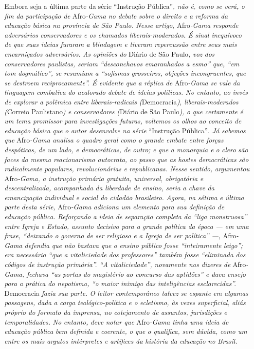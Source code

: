 \begin{didascalia}
Embora seja a última parte da série ``Instrução Pública''\emph{, não é,
como se verá, o fim da participação de} Afro\emph{-Gama no debate sobre
o direito e a reforma da educação básica na província de São Paulo.
Nesse artigo,} Afro\emph{-Gama responde adversários conservadores e os
chamados liberais-moderados. É sinal inequívoco de que suas ideias
furaram a blindagem e tiveram repercussão entre seus mais encarniçados
adversários. As opiniões do} Diário de São Paulo\emph{, voz dos
conservadores paulistas, seriam ``desconchavos emaranhados a esmo'' que,
``em tom dogmático'', se resumiam a ``sofismas grosseiros, objeções
incongruentes, que se destroem reciprocamente''. É evidente que a réplica
de} Afro\emph{-Gama se vale da linguagem combativa do acalorado debate
de ideias políticas. No entanto, ao invés de explorar a polêmica entre
liberais-radicais (}Democracia\emph{), liberais-moderados (}Correio
Paulistano\emph{) e conservadores (}Diário de São Paulo\emph{), o que
certamente é um tema promissor para investigações futuras, voltemos os
olhos ao conceito de educação básica que o autor desenvolve na série}
``Instrução Pública''\emph{. Já sabemos que} Afro\emph{-Gama analisa o
quadro geral como o grande embate entre forças despóticas, de um lado, e
democráticas, de outro; e que a monarquia e o clero são faces do mesmo
reacionarismo autocrata, ao passo que as hostes democráticas são
radicalmente populares, revolucionárias e republicanas. Nesse sentido,
argumentou} Afro\emph{-Gama, a instrução primária gratuita, universal,
obrigatória e descentralizada, acompanhada da liberdade de ensino, seria
a chave da emancipação individual e social do cidadão brasileiro. Agora,
na sétima e última parte desta série,} Afro\emph{-Gama adiciona um
elemento para sua definição de educação pública. Reforçando a ideia de
separação completa da ``liga monstruosa'' entre Igreja e Estado, assunto
decisivo para a grande política da época --- em uma frase,
``deixando o governo de ser religioso e a Igreja de ser política''
---,} Afro\emph{-Gama defendia que não bastava que o ensino público fosse
``inteiramente leigo''; era necessário ``que a vitaliciedade dos
professores'' também fosse ``eliminada dos códigos de instrução primária''.
``A vitaliciedade'', novamente nos dizeres de} Afro\emph{-Gama, fechava
``as portas do magistério ao concurso das aptidões'' e dava ensejo para a
prática do nepotismo, ``o maior inimigo das inteligências esclarecidas''.}
Democracia \emph{fazia sua parte. O leitor contemporâneo talvez se
espante em algumas passagens, dada a carga teológico-política e o
ecletismo, às vezes superficial, aliás próprio do formato da imprensa,
no cotejamento de assuntos, jurisdições e temporalidades. No entanto,
deve notar que} Afro\emph{-Gama tinha uma ideia de educação pública bem
definida e coerente, o que o qualifica, sem dúvida, como um entre os
mais argutos intérpretes e artífices da história da educação no Brasil.}
\end{didascalia}


